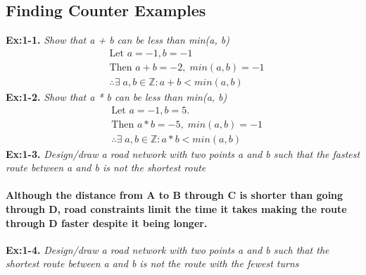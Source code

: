 \subsection{Finding Counter Examples}

\quad\textbf{Ex:1-1.} \emph{Show that a + b can be less than min(a, b)} 
%
{\color{answer}{}
\begin{align*}
	&\text{Let } a = -1, b = -1 \\
	&\text{Then } a + b = -2, \; min(a,b) = -1 \\
	&\therefore \exists \; a, b \in \mathbb{Z} : a+b < min(a,b) 
\end{align*}}
%
\quad\textbf{Ex:1-2.} \emph{Show that a * b can be less than min(a, b)}
%
{\color{answer}{}
\begin{align*} 
	&\text{Let } a = -1, b = 5. \\
	&\text{Then } a*b = -5, \; min(a,b) = -1\\
	&\therefore \exists \; a, b \in \mathbb{Z} : a*b < min(a,b)
\end{align*}}
%
\quad\textbf{Ex:1-3.} \emph{Design/draw a road network with two points a and b such that the fastest route between a and b is not the shortest route}
{\color{answer}{}
\begin{center}
\end{center}}
\paragraph{{\color{answer}{}Although the distance from A to B through C is shorter than going through D, road constraints limit the time it takes making the route through D faster despite it being longer. }} 
%
\quad\textbf{Ex:1-4.} \emph{Design/draw a road network with two points a and b such that the shortest route between a and b is not the route with the fewest turns}
{\color{answer}{}
\begin{center}
\end{center}}
